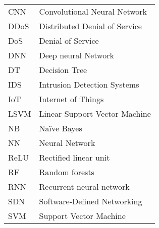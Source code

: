 \begin{tabular}{p{3cm}l}
CNN & Convolutional Neural Network \\
DDoS & Distributed Denial of Service \\
DoS & Denial of Service \\
DNN & Deep neural Network \\
DT & Decision Tree \\
IDS & Intrusion Detection Systems \\
IoT & Internet of Things \\
LSVM & Linear Support Vector Machine \\
NB & Naïve Bayes \\
NN & Neural Network \\
ReLU & Rectified linear unit \\
RF & Random forests \\
RNN & Recurrent neural network \\
SDN & Software-Defined Networking \\
SVM & Support Vector Machine  \\
\end{tabular}